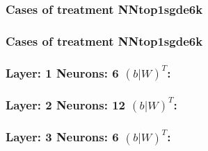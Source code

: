 \documentclass[18pt,c]{beamer}
\begin{document}
 \begin{frame}
 \fontsize{8pt}{9pt}\selectfont
 \frametitle{ Cases of treatment NNtop1sgde6k }

 \label{ExpDSolutionTable032.tex}  
 \end{frame}

 \begin{frame}
 \fontsize{8pt}{9pt}\selectfont
 \frametitle{ Cases of treatment NNtop1sgde6k }

 \label{ExpDSolutionTable033.tex}  
 \end{frame}


 \begin{frame}
 \fontsize{8pt}{9pt}\selectfont
 \frametitle{ Layer: 1 Neurons: 6  $(b|W)^T$: 
 }

 \label{ExpDNNWeightTable027.tex}  
 \end{frame}


 \begin{frame}
 \fontsize{8pt}{9pt}\selectfont
 \frametitle{ Layer: 2 Neurons: 12  $(b|W)^T$: 
 }

 \label{ExpDNNWeightTable028.tex}  
 \end{frame}


 \begin{frame}
 \fontsize{8pt}{9pt}\selectfont
 \frametitle{ Layer: 3 Neurons: 6  $(b|W)^T$: 
 }

 \label{ExpDNNWeightTable029.tex}  
 \end{frame}
\end{document}
